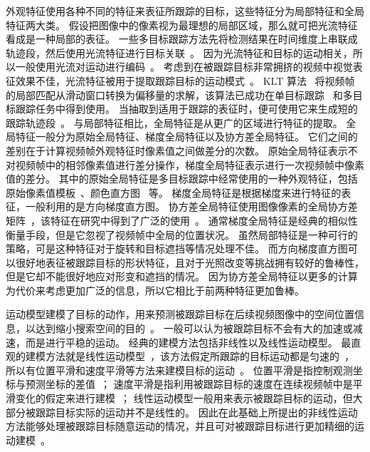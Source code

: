 外观特征使用各种不同的特征来表征所跟踪的目标，这些特征分为局部特征和全局特征两大类。
假设把图像中的像素视为最理想的局部区域，那么就可把光流特征看成是一种局部的表征。
一些多目标跟踪方法先将检测结果在时间维度上串联成轨迹段，然后使用光流特征进行目标关联~\cite{using2009,zhao2012tracking}。
因为光流特征和目标的运动相关，所以一般使用光流对运动进行编码~\cite{optic_flow,choi2015near-online}。
考虑到在被跟踪目标非常拥挤的视频中视觉表征效果不佳，光流特征被用于提取跟踪目标的运动模式~\cite{ali2008floor}。
KLT 算法~\cite{lucas1981an} 将视频帧的局部匹配从滑动窗口转换为偏移量的求解，该算法已成功在单目标跟踪~\cite{shi1994good} 和多目标跟踪任务中得到使用。
当抽取到适用于跟踪的表征时，便可使用它来生成短的跟踪轨迹段~\cite{using2009,zhao2012tracking}。
与局部特征相比，全局特征是从更广的区域进行特征的提取。
全局特征一般分为原始全局特征、梯度全局特征以及协方差全局特征。
它们之间的差别在于计算视频帧外观特征时像素值之间做差分的次数。
原始全局特征表示不对视频帧中的相邻像素值进行差分操作，梯度全局特征表示进行一次视频帧中像素值的差分。
其中的原始全局特征是多目标跟踪中经常使用的一种外观特征，包括原始像素值模板~\cite{yamaguchi2011who}、颜色直方图~\cite{mitzel2010multi-person} 等。
梯度全局特征是根据梯度来进行特征的表征，一般利用的是方向梯度直方图。
协方差全局特征使用图像像素的全局协方差矩阵~\cite{tuzel2006region}，该特征在研究中得到了广泛的使用~\cite{kuo2010multi-target,hu2012single,henriques2011globally}。
通常梯度全局特征是经典的相似性衡量手段，但是它忽视了视频帧中全局的位置状况。
虽然局部特征是一种可行的策略，可是这种特征对于旋转和目标遮挡等情况处理不佳。
而方向梯度直方图可以很好地表征被跟踪目标的形状特征，且对于光照改变等挑战拥有较好的鲁棒性，但是它却不能很好地应对形变和遮挡的情况。
因为协方差全局特征以更多的计算为代价来考虑更加广泛的信息，所以它相比于前两种特征更加鲁棒。


运动模型建模了目标的动作，用来预测被跟踪目标在后续视频图像中的空间位置信息，以达到缩小搜索空间的目的~\cite{motion_doc}。
一般可以认为被跟踪目标不会有大的加速或减速，而是进行平稳的运动。
经典的建模方法包括非线性以及线性运动模型。
最直观的建模方法就是线性运动模型~\cite{breitenstein2009robust,shafique2008a}，该方法假定所跟踪的目标运动都是匀速的~\cite{breitenstein2009robust}，
所以有位置平滑和速度平滑等方法来建模目标的运动~\cite{kuo2011how}。
位置平滑是指控制观测坐标与预测坐标的差值~\cite{yang2012an}；
速度平滑是指利用被跟踪目标的速度在连续视频帧中是平滑变化的假定来进行建模~\cite{qin2012improving}；
线性运动模型一般用来表示被跟踪目标的运动，但大部分被跟踪目标实际的运动并不是线性的。
因此在此基础上所提出的非线性运动方法能够处理被跟踪目标随意运动的情况，并且可对被跟踪目标进行更加精细的运动建模~\cite{yang2012multi-target}。



